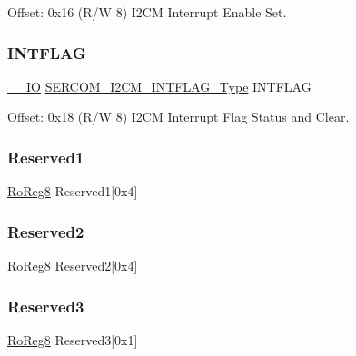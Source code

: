 Offset\+: 0x16 (R/W 8) I2\+CM Interrupt Enable Set. 

\mbox{\label{struct_sercom_i2cm_aaaa13d8df29742ec8b63c07fcc84e590}} 
\subsubsection{\texorpdfstring{INTFLAG}{INTFLAG}}
{\footnotesize\ttfamily \mbox{\hyperlink{core__cm0plus_8h_aec43007d9998a0a0e01faede4133d6be}{\+\_\+\+\_\+\+IO}} \mbox{\hyperlink{union_s_e_r_c_o_m___i2_c_m___i_n_t_f_l_a_g___type}{S\+E\+R\+C\+O\+M\+\_\+\+I2\+C\+M\+\_\+\+I\+N\+T\+F\+L\+A\+G\+\_\+\+Type}} I\+N\+T\+F\+L\+AG}



Offset\+: 0x18 (R/W 8) I2\+CM Interrupt Flag Status and Clear. 

\mbox{\label{struct_sercom_i2cm_a1106a1fe7c5fa01a183c54b4b992a7f0}} 
\subsubsection{\texorpdfstring{Reserved1}{Reserved1}}
{\footnotesize\ttfamily \mbox{\hyperlink{group___s_a_m_d21_e15_a__definitions_ga0d957f1433aaf5d70e4dc2b68288442d}{Ro\+Reg8}} Reserved1\mbox{[}0x4\mbox{]}}

\mbox{\label{struct_sercom_i2cm_a78f3c89e13bd565a077e9418f43aaa04}} 
\subsubsection{\texorpdfstring{Reserved2}{Reserved2}}
{\footnotesize\ttfamily \mbox{\hyperlink{group___s_a_m_d21_e15_a__definitions_ga0d957f1433aaf5d70e4dc2b68288442d}{Ro\+Reg8}} Reserved2\mbox{[}0x4\mbox{]}}

\mbox{\label{struct_sercom_i2cm_ae12c3e940f27988a085afebe2f779a21}} 
\subsubsection{\texorpdfstring{Reserved3}{Reserved3}}
{\footnotesize\ttfamily \mbox{\hyperlink{group___s_a_m_d21_e15_a__definitions_ga0d957f1433aaf5d70e4dc2b68288442d}{Ro\+Reg8}} Reserved3\mbox{[}0x1\mbox{]}}

